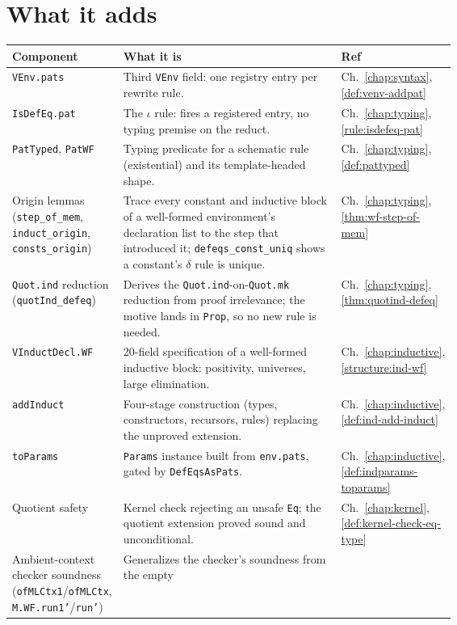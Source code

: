 \section{What it adds}
\par\smallskip\noindent
\begin{tabular}{lp{0.64\linewidth}l}
\toprule
Component & What it is & Ref \\
\midrule
\texttt{VEnv.pats} & Third \texttt{VEnv} field: one registry entry per rewrite rule. &
Ch.~\ref{chap:syntax}, \ref{def:venv-addpat} \\
\texttt{IsDefEq.pat} & The $\iota$ rule: fires a registered entry, no typing premise on the
reduct. & Ch.~\ref{chap:typing}, \ref{rule:isdefeq-pat} \\
\texttt{PatTyped}, \texttt{PatWF} & Typing predicate for a schematic rule (existential) and
its template-headed shape. & Ch.~\ref{chap:typing}, \ref{def:pattyped} \\
Origin lemmas (\texttt{step\_of\_mem}, \texttt{induct\_origin}, \texttt{consts\_origin}) &
Trace every constant and inductive block of a well-formed environment's declaration list to
the step that introduced it; \texttt{defeqs\_const\_uniq} shows a constant's $\delta$ rule is
unique. & Ch.~\ref{chap:typing}, \ref{thm:wf-step-of-mem} \\
\texttt{Quot.ind} reduction (\texttt{quotInd\_defeq}) & Derives the
\texttt{Quot.ind}-on-\texttt{Quot.mk} reduction from proof irrelevance; the motive lands in
\texttt{Prop}, so no new rule is needed. & Ch.~\ref{chap:typing}, \ref{thm:quotind-defeq} \\
\texttt{VInductDecl.WF} & 20-field specification of a well-formed inductive block:
positivity, universes, large elimination. & Ch.~\ref{chap:inductive}, \ref{structure:ind-wf} \\
\texttt{addInduct} & Four-stage construction (types, constructors, recursors, rules)
replacing the unproved extension. & Ch.~\ref{chap:inductive}, \ref{def:ind-add-induct} \\
\texttt{toParams} & \texttt{Params} instance built from \texttt{env.pats}, gated by
\texttt{DefEqsAsPats}. & Ch.~\ref{chap:inductive}, \ref{def:indparams-toparams} \\
Quotient safety & Kernel check rejecting an unsafe \texttt{Eq}; the quotient extension proved
sound and unconditional. & Ch.~\ref{chap:kernel}, \ref{def:kernel-check-eq-type} \\
Ambient-context checker soundness (\texttt{ofMLCtx1}/\texttt{ofMLCtx},
\texttt{M.WF.run1'}/\texttt{run'}) & Generalizes the checker's soundness from the empty

\end{tabular}
